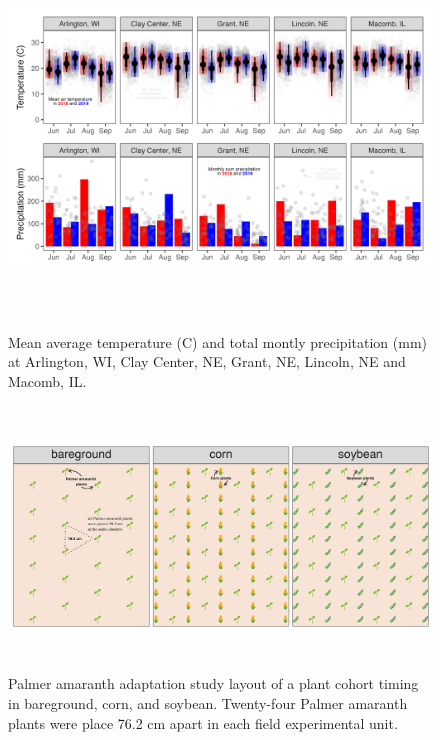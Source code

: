 \documentclass[utf8]{frontiersSCNS}
\begin{document}
\begin{figure}

{\centering \includegraphics[width=160mm,height=100mm]{../data analysis/weather/Figure 1} 

}

\caption{Mean average temperature (C) and total montly precipitation (mm) at Arlington, WI, Clay Center, NE, Grant, NE, Lincoln, NE and Macomb, IL.}\label{fig:Figure-1}
\end{figure}

\begin{figure}

{\centering \includegraphics[width=150mm,height=70mm]{../data analysis/figures/Figure 2} 

}

\caption{Palmer amaranth adaptation study layout of a plant cohort timing in bareground, corn, and soybean. Twenty-four Palmer amaranth plants were place 76.2 cm apart in each field experimental unit.}\label{fig:Figure-2}
\end{figure}
\end{document}

